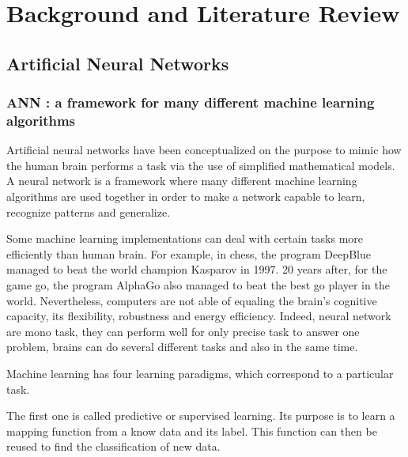 
\chapter{Background and Literature Review} %

\label{Chapter2} %




\section{Artificial Neural Networks}
\subsection{ANN : a framework for many different machine learning algorithms}

Artificial neural networks have been conceptualized on the purpose to mimic how the human brain performs a task via the use of simplified mathematical models. A neural network is a framework where many different machine learning algorithms are used together in order to make a network capable to learn, recognize patterns and generalize. 

Some machine learning implementations can deal with certain tasks more efficiently than human brain. For example, in chess, the program DeepBlue managed to beat the world champion Kasparov in 1997. 20 years after, for the game go, the program AlphaGo also managed to beat the best go player in the world. Nevertheless, computers are not able of equaling the brain's cognitive capacity, its flexibility, robustness and energy efficiency. Indeed, neural network are mono task, they can perform well for only precise task to answer one problem, brains can do several different tasks and also in the same time.

Machine learning has four learning paradigms, which correspond to a particular task.

The first one is called predictive or supervised learning. Its purpose is to learn a mapping function from a know data and its label. This function can then be reused to find the classification of new data. 

